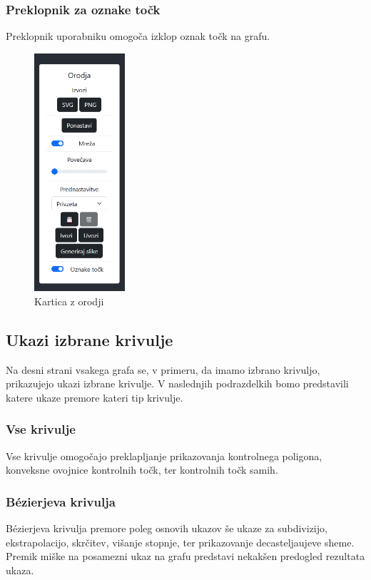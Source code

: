 \documentclass[isrm2, tisk]{fmfdelo}
\begin{document}
    \subsubsection{Preklopnik za oznake točk}
    Preklopnik uporabniku omogoča izklop oznak točk na grafu.

    \begin{figure}[h]
        \centering
        \includegraphics[width = 0.30\textwidth]{images/bezeg/orodja}
        \caption{Kartica z orodji}
        \label{fig:bezeg:kartica-z-orodji}
    \end{figure}

    \subsection{Ukazi izbrane krivulje}
    Na desni strani vsakega grafa se, v primeru, da imamo izbrano krivuljo, prikazujejo ukazi izbrane krivulje.
    V naslednjih podrazdelkih bomo predstavili katere ukaze premore kateri tip krivulje.

    \subsubsection{Vse krivulje}
    Vse krivulje omogočajo preklapljanje prikazovanja kontrolnega poligona, konveksne ovojnice kontrolnih točk, ter kontrolnih točk samih.

    \subsubsection{Bézierjeva krivulja}
    Bézierjeva krivulja premore poleg osnovih ukazov še ukaze za subdivizijo, ekstrapolacijo, skrčitev, višanje stopnje, ter prikazovanje decasteljaujeve sheme.
    Premik miške na posamezni ukaz na grafu predstavi nekakšen predogled rezultata ukaza.
\end{document}
